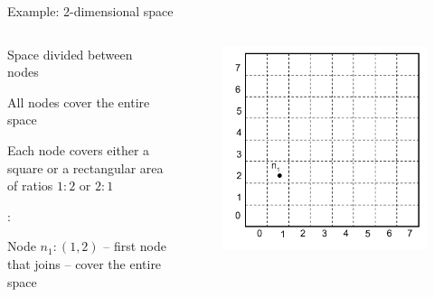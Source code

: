 \begin{frame}{Example: 2-dimensional space}

\begin{columns}
\begin{column}{0.5\textwidth}
\BIL
\item Space divided between nodes
\item All nodes cover the entire space
\item Each node covers either a square or a rectangular area of ratios $1:2$ or $2:1$
\EIL

\smallskip
{}:\\
\BI
	\item Node $n_1:(1, 2)$ -- first node that joins -- cover the entire space
\EI
\end{column}
\begin{column}{0.5\textwidth}
\begin{figure}
	\includegraphics[width=1.0\textwidth]{can1}
\end{figure}
\end{column}
\end{columns}
		
\end{frame}	


